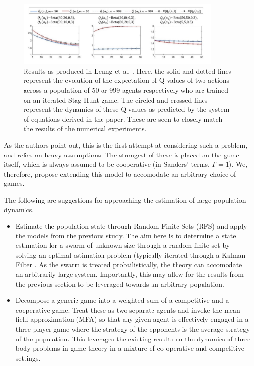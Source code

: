 \documentclass[.../main.tex]{subfiles}
\begin{document}
    \begin{figure}[h]
    	\centering
    	\includegraphics[width=0.9\textwidth]{Figures/LeungPredictions}
    	\caption{ \label{fig::LeungPredictions} Results as produced in Leung et al. \cite{Hu2019}.
    	Here, the solid and dotted lines represent the evolution of the expectation of Q-values of
    	two actions across a population of 50 or 999 agents respectively who are trained on an
    	iterated Stag Hunt game. The circled and crossed
    	lines represent the dynamics of these Q-values as predicted by the system of equations
    	derived in the paper. These are seen to closely match the results of the numerical
    	experiments.}
    \end{figure}

   	As the authors point out, this is the first attempt at considering such a problem, and relies on
	heavy assumptions. The strongest of these is placed on the game itself, which is always
	assumed to be cooperative (in Sanders' terms, $\Gamma = 1$). We, therefore, propose extending
	this model to accomodate an arbitrary choice of games. 

	The following are suggestions for approaching the estimation of large population dynamics.

	\begin{itemize}
		\item Estimate the population state through Random Finite Sets (RFS) and
	apply the models from the previous study. The aim here is to determine a state
	estimation for a swarm of unknown size through a random finite set by solving
	an optimal estimation problem  (typically iterated through a Kalman Filter
	\cite{Doerr2019}. As the swarm is treated probailistically, the theory can
	accomodate an arbitrarily large system. Importantly, this may allow for the
	results from the previous section to be leveraged towards an arbitrary
	population. 

	\item Decompose a generic game into a weighted sum of a
	competitive and a cooperative game. Treat these as two separate agents and
	invoke the mean field approximation (MFA) so that any given agent is
	effectively engaged in a three-player game where the strategy of the opponents
	is the average strategy of the population. This leverages the existing results
	on the dynamics of three body problems in game theory \cite{Nagarajan2018} in
	a mixture of co-operative and competitive settings.
	\end{itemize}
\end{document}
